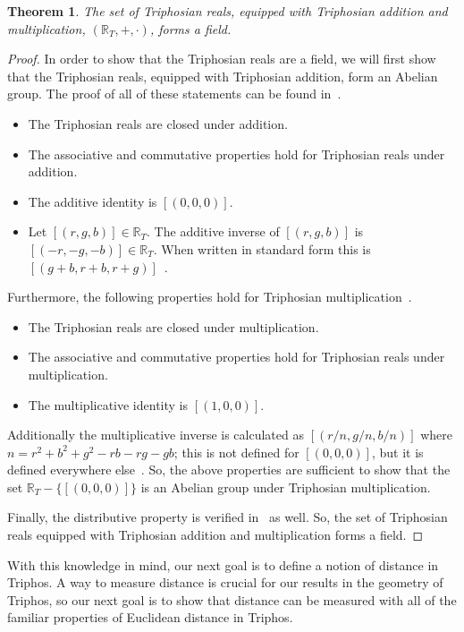 \documentclass[11pt]{article}
\newcommand{\Tri}{\mathbb{R}_T}
\theoremstyle{definition}
\theoremstyle{plain}
\newtheorem{theorem}{Theorem}
\theoremstyle{remark}
\begin{document}
	\begin{theorem}
		The set of Triphosian reals, equipped with Triphosian addition and
		multiplication, \((\Tri, +, \cdot)\), forms a field.~\cite{egging}
	\end{theorem}
	\begin{proof}
		In order to show that the Triphosian reals are a field, we will first
		show that the Triphosian reals, equipped with Triphosian addition, form
		an Abelian group. The proof of all of these statements can be found
		in~\cite{egging}.
		\begin{itemize}
			\item The Triphosian reals are closed under addition.
			\item The associative and commutative properties hold for
			Triphosian reals under addition.
			\item The additive identity is \([(0,0,0)]\).
			\item Let \([(r,g,b)] \in \Tri\). The additive inverse of
			\([(r,g,b)]\) is \([(-r,-g,-b)] \in \Tri\). When written in
			standard form this is \([(g+b, r+b, r+g)]\)~\cite{grossnickle}.
		\end{itemize}

		Furthermore, the following properties hold for Triphosian
		multiplication~\cite{egging}.
		\begin{itemize}
			\item The Triphosian reals are closed under multiplication.
			\item The associative and commutative properties hold for
			Triphosian reals under multiplication.
			\item The multiplicative identity is \([(1,0,0)]\).
		\end{itemize}

		Additionally the multiplicative inverse is calculated as
		\([(r/n,g/n,b/n)]\) where \(n = r^2 + b^2 + g^2 - rb - rg -gb\); this
		is not defined for \([(0,0,0)]\), but it is defined everywhere
		else~\cite{egging}. So, the above properties are sufficient to show
		that the set \(\Tri - \{[(0,0,0)]\}\) is an Abelian group under
		Triphosian multiplication.

		Finally, the distributive property is verified in~\cite{egging} as
		well. So, the set of Triphosian reals equipped with Triphosian addition
		and multiplication forms a field.
	\end{proof}

	With this knowledge in mind, our next goal is to define a notion of
	distance in Triphos. A way to measure distance is crucial for our results
	in the geometry of Triphos, so our next goal is to show that distance can
	be measured with all of the familiar properties of Euclidean distance in
	Triphos.
\end{document}
